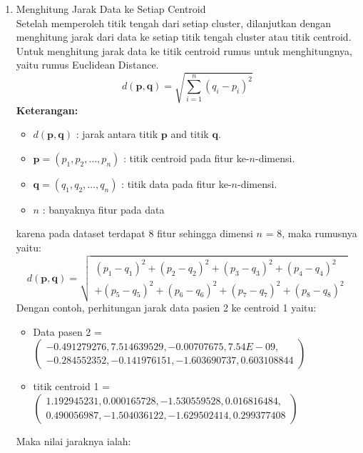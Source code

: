 \documentclass[english,12pt,a4paper,openany]{book}
\begin{document}
\begin{enumerate}
		\item Menghitung Jarak Data ke Setiap Centroid\\
		Setelah memperoleh titik tengah dari setiap cluster, dilanjutkan dengan menghitung jarak dari data ke setiap titik tengah cluster atau titik centroid. Untuk menghitung jarak data ke titik centroid rumus untuk menghitungnya, yaitu rumus Euclidean Distance.\\
		\[
		d(\mathbf{p}, \mathbf{q}) = \sqrt{\sum_{i=1}^n (q_i - p_i)^2}
		\]
		\textbf{Keterangan:}
		\begin{itemize}
			\item \( d(\mathbf{p}, \mathbf{q}) \) : jarak antara titik \( \mathbf{p} \) and titik \( \mathbf{q} \).
			\item \( \mathbf{p} = (p_1, p_2, \dots, p_n) \) : titik centroid pada fitur ke-\( n \)-dimensi.
			\item \( \mathbf{q} = (q_1, q_2, \dots, q_n) \) : titik data pada fitur ke-\( n \)-dimensi.
			\item \( n \) : banyaknya fitur pada data
		\end{itemize}
		karena pada dataset terdapat 8 fitur sehingga dimensi \( n \) = 8, maka rumusnya yaitu:\\
		\[
		d(\mathbf{p}, \mathbf{q}) = \sqrt{
			\begin{array}{l}
				(p_1 - q_1)^2 + (p_2 - q_2)^2 + (p_3 - q_3)^2 + (p_4 - q_4)^2 \\
				+ (p_5 - q_5)^2 + (p_6 - q_6)^2 + (p_7 - q_7)^2 + (p_8 - q_8)^2
			\end{array}
		}
		\]
		Dengan contoh, perhitungan jarak data pasien 2 ke centroid 1 yaitu:\\
		\begin{itemize}
			\item Data pasen 2 = \( (\begin{array}{l}
				-0.491279276, 7.514639529, -0.00707675, 7.54E-09, \\
				-0.284552352, -0.141976151, -1.603690737, 0.603108844
			\end{array} ) \)
			\item titik centroid 1 = \( (\begin{array}{l}
				1.192945231, 0.000165728, -1.530559528, 0.016816484, \\
				0.490056987, -1.504036122, -1.629502414, 0.299377408
			\end{array} ) \)
		\end{itemize}
		Maka nilai jaraknya ialah:\\

\end{enumerate}
\end{document}
